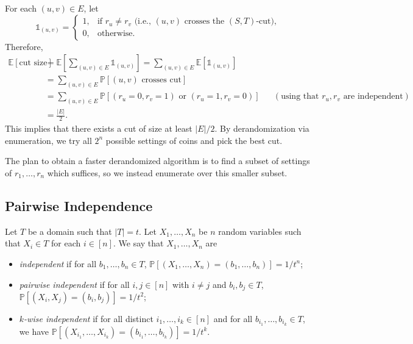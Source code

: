 \documentclass[letterpaper, reqno,11pt]{article}
\newcommand{\PP}{\mathbb{P}}
\newcommand{\EE}{\mathbb{E}}
\begin{document}
For each $(u, v) \in E$, let
$$ \mathds 1_{(u, v)} = \left\{
  \begin{array}{ll}
    1, & \text{if $r_u \neq r_v$ (i.e., $(u, v)$ crosses the $(S, T)$-cut)}, \\
    0, & \text{otherwise}.
  \end{array}
\right. $$
Therefore,
\begin{align*}
  \EE[\text{cut size}] &= \EE\left[\sum_{(u, v) \in E} \mathds 1_{(u, v)}\right] = \sum_{(u, v) \in E} \EE\left[\mathds 1_{(u, v)}\right] \\
  &= \sum_{(u, v) \in E} \PP[\text{$(u, v)$ crosses cut}] \\
  &= \sum_{(u, v) \in E} \PP\left[(r_u = 0, r_v = 1) \text{ or } (r_u = 1, r_v = 0)\right] && (\text{using that $r_u, r_v$ are independent}) \\
  &= \frac{|E|}{2}.
\end{align*}
This implies that there exists a cut of size at least $|E|/2$. By derandomization via enumeration, we try all $2^n$ possible settings of coins and pick the best cut.

The plan to obtain a faster derandomized algorithm is to find a subset of settings of $r_1, \ldots, r_n$ which suffices, so we instead enumerate over this smaller subset.

\subsection{Pairwise Independence}

\begin{definition}
  Let $T$ be a domain such that $|T| = t$. Let $X_1, \ldots, X_n$ be $n$ random variables such that $X_i \in T$ for each $i \in [n]$. We say that $X_1, \ldots, X_n$ are
  \begin{itemize}[itemsep=0pt]
    \item \emph{independent} if for all $b_1, \ldots, b_n \in T$, $\PP[(X_1, \ldots, X_n) = (b_1, \ldots, b_n)] = 1/t^n$;
    \item \emph{pairwise independent} if for all $i, j \in [n]$ with $i \neq j$ and $b_i, b_j \in T$, $\PP[(X_i, X_j) = (b_i, b_j)] = 1/t^2$;
    \item \emph{$k$-wise independent} if for all distinct $i_1, \ldots, i_k \in [n]$ and for all $b_{i_1}, \ldots, b_{i_k} \in T$, we have $\PP[(X_{i_1}, \ldots, X_{i_k}) = (b_{i_1}, \ldots, b_{i_k})] = 1/t^k$.
  \end{itemize}
\end{definition}
\end{document}
